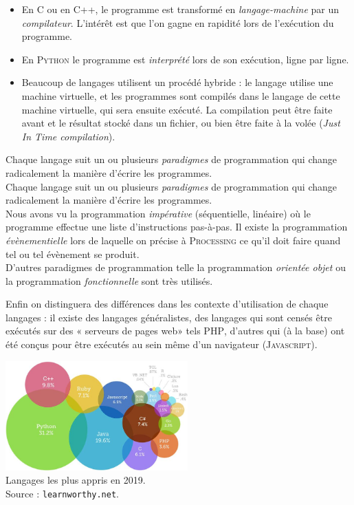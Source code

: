 \begin{itemize}
    \item   En \textsc{C} ou en \textsc{C++}, le programme est transformé en \textit{langage-machine} par un \textit{compilateur}. L'intérêt est que l'on gagne en rapidité lors de l'exécution du programme.
    \item   En \textsc{Python} le programme est \textit{interprété}  lors de son exécution, ligne par ligne.
    \item   Beaucoup de langages utilisent un procédé hybride : le langage utilise une machine virtuelle, et les programmes sont compilés dans le langage de cette machine virtuelle, qui sera ensuite exécuté. La compilation peut être faite avant et le résultat stocké dans un fichier, ou bien être faite à la volée (\textit{Just In Time compilation}).
\end{itemize}



Chaque langage suit un ou plusieurs \textit{paradigmes} de programmation qui change radicalement la manière d'écrire les programmes.\\
Chaque langage suit un ou plusieurs \textit{paradigmes} de programmation qui change radicalement la manière d'écrire les programmes.\\
Nous avons vu la programmation \textit{impérative} (séquentielle, linéaire) où le programme effectue une liste d'instructions pas-à-pas. Il existe la programmation \textit{évènementielle} lors de laquelle on précise à \textsc{Processing} ce qu'il doit faire quand tel ou tel évènement se produit.\\
D'autres paradigmes de programmation telle la programmation \textit{orientée objet} ou la programmation \textit{fonctionnelle} sont très utilisés.

Enfin on distinguera des différences dans les contexte d'utilisation de chaque langages : il existe des langages généralistes, des langages qui sont censés être exécutés sur des « serveurs de pages web»  tels \textsc{PHP}, d'autres qui (à la base) ont été conçus pour être exécutés au sein même d'un navigateur (\textsc{Javascript}).

\begin{center}
    \includegraphics[width=7cm]{ch-langages/img/languages.png}\\ \scriptsize   Langages les plus appris en 2019.\\
    Source : \texttt{learnworthy.net}.
\end{center}
